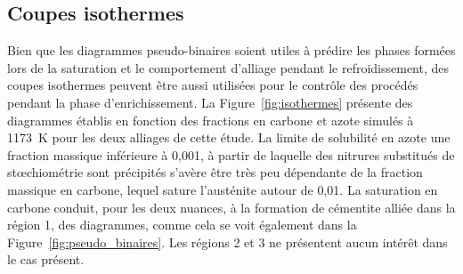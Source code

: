 \subsection{Coupes isothermes}

Bien que les diagrammes pseudo-binaires soient utiles à prédire les phases formées lors de la saturation et le comportement d'alliage pendant le refroidissement, des coupes isothermes peuvent être aussi utilisées pour le contrôle des procédés pendant la phase d'enrichissement. La Figure~\ref{fig:isothermes} présente des diagrammes établis en fonction des fractions en carbone et azote simulés à \SI{1173}{\kelvin} pour les deux alliages de cette étude. La limite de solubilité en azote \textendash{} une fraction massique inférieure à 0,001, à partir de laquelle des nitrures substitués de st{\oe}chiométrie  sont précipités \textendash{} s'avère être très peu dépendante de la fraction massique en carbone, lequel sature l'austénite autour de 0,01. La saturation en carbone conduit, pour les deux nuances, à la formation de cémentite alliée dans la région \og{}1\fg{}, des diagrammes, comme cela se voit également dans la Figure~\ref{fig:pseudo_binaires}. Les régions \og{}2\fg{} et \og{}3\fg{} ne présentent aucun intérêt dans le cas présent.

